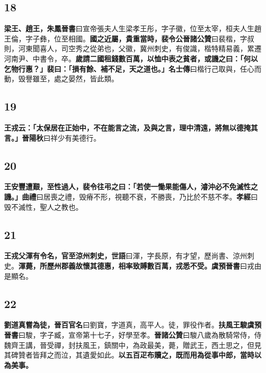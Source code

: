 \subsection*{18}

\textbf{梁王、趙王，}{\footnotesize \textbf{朱鳳晉書}曰宣帝張夫人生梁孝王彤，字子徽，位至太宰，桓夫人生趙王倫，字子彝，位至相國。}\textbf{國之近屬，貴重當時，裴令公}{\footnotesize \textbf{晉諸公贊}曰裴楷，字叔則，河東聞喜人，司空秀之從弟也，父徽，冀州刺史，有俊識，楷特精易義，累遷河南尹、中書令，卒。}\textbf{歲請二國租錢數百萬，以恤中表之貧者，或譏之曰：「何以乞物行惠？」裴曰：「損有餘、補不足，天之道也。」}{\footnotesize \textbf{名士傳}曰楷行己取與，任心而動，毁譽雖至，處之晏然，皆此類。}

\subsection*{19}

\textbf{王戎云：「太保居在正始中，不在能言之流，及與之言，理中清遠，將無以德掩其言。」}{\footnotesize \textbf{晉陽秋}曰祥少有美德行。}

\subsection*{20}

\textbf{王安豐遭艱，至性過人，裴令往弔之曰：「若使一慟果能傷人，濬沖必不免滅性之譏。」}{\footnotesize \textbf{曲禮}曰居喪之禮，毁瘠不形，視聽不衰，不勝喪，乃比於不慈不孝。\textbf{孝經}曰毁不滅性，聖人之教也。}

\subsection*{21}

\textbf{王戎父渾有令名，官至涼州刺史，}{\footnotesize \textbf{世語}曰渾，字長原，有才望，歷尚書、涼州刺史。}\textbf{渾薨，所歷州郡義故懷其德惠，相率致賻數百萬，戎悉不受。}{\footnotesize \textbf{虞預晉書}曰戎由是顯名。}

\subsection*{22}

\textbf{劉道真嘗為徒，}{\footnotesize \textbf{晉百官名}曰劉寶，字道真，高平人。徒，罪役作者。}\textbf{扶風王駿}{\footnotesize \textbf{虞預晉書}曰駿，字子臧，宣帝第十七子，好學至孝。\textbf{晉諸公贊}曰駿八歲為散騎常侍，侍魏齊王講，晉受禪，封扶風王，鎮關中，為政最美，薨，贈武王，西土思之，但見其碑贊者皆拜之而泣，其遺愛如此。}\textbf{以五百疋布贖之，既而用為從事中郎，當時以為美事。}

